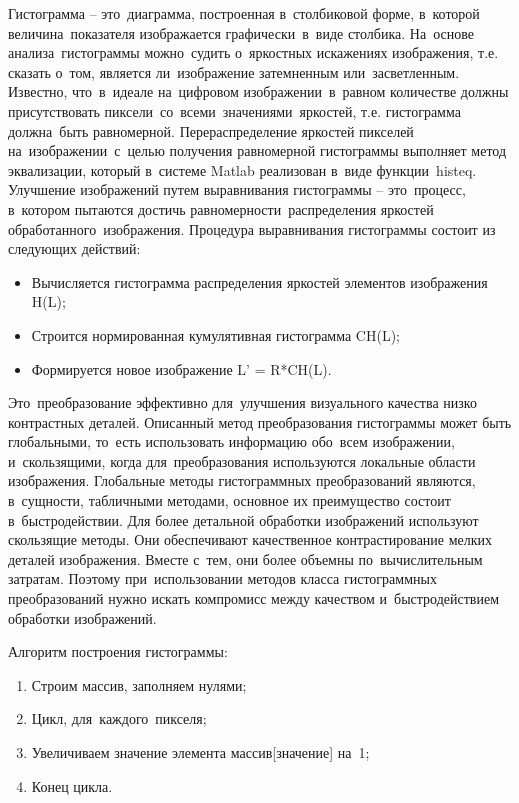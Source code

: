 \documentclass{ou}
\begin{document}
Гистограмма -- это~диаграмма, построенная в~столбиковой форме, в~которой величина~показателя изображается графически~в~виде столбика. На~основе анализа~гистограммы можно~судить о~яркостных искажениях изображения, т.е. сказать о~том, является ли~изображение затемненным или~засветленным. Известно, что~в~идеале на~цифровом изображении~в~равном количестве должны присутствовать пиксели~со~всеми~значениями~яркостей, т.е. гистограмма должна~быть равномерной. Перераспределение яркостей пикселей на~изображении~с~целью получения равномерной гистограммы выполняет метод эквализации, который в~системе Matlab реализован в~виде функции~histeq. Улучшение изображений путем выравнивания гистограммы -- это~процесс, в~котором пытаются достичь равномерности~распределения яркостей обработанного~изображения. Процедура выравнивания гистограммы состоит из следующих действий:
\begin{itemize}[label=-, itemindent=2em, nosep]
\item Вычисляется гистограмма распределения яркостей элементов изображения H(L);
\item Строится нормированная кумулятивная гистограмма CH(L);
\item Формируется новое изображение L' = R*CH(L).
\end{itemize}
Это~преобразование эффективно для~улучшения визуального качества низко контрастных деталей. Описанный метод преобразования гистограммы может быть глобальными, то~есть использовать информацию обо~всем изображении, и~скользящими, когда для~преобразования используются локальные области изображения. Глобальные методы гистограммных преобразований являются, в~сущности, табличными методами, основное их преимущество состоит в~быстродействии. Для более детальной обработки изображений используют скользящие методы. Они обеспечивают качественное контрастирование мелких деталей изображения. Вместе с~тем, они более объемны по~вычислительным затратам. Поэтому при~использовании методов класса гистограммных преобразований нужно искать компромисс между качеством и~быстродействием обработки изображений.

Алгоритм построения гистограммы:
\begin{enumerate}[itemindent=2em, nosep, label=\arabic*)]
\item Строим массив, заполняем нулями;
\item Цикл, для~каждого~пикселя;
\item Увеличиваем значение элемента массив[значение] на~1;
\item Конец цикла.
\end{enumerate}
\end{document}
